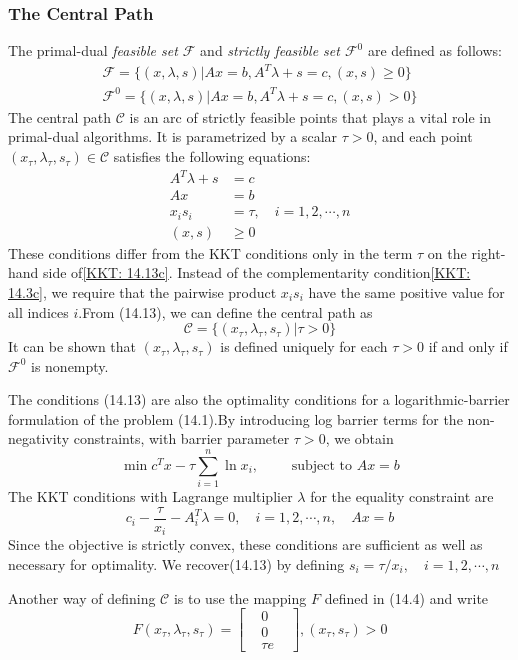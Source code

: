 \subsubsection{The Central Path}
The primal-dual \textit{feasible set $\mathcal{F} $ } and \textit{strictly feasible set $\mathcal{F}^0 $ } are defined as
follows:
\begin{align}
    \mathcal{F} = \{(x, \lambda, s)| Ax = b, A^T\lambda + s = c, (x, s) \geq 0 \}  \tag{14.12a}\label{ipm: 14.12a} \\
    \mathcal{F}^0 = \{(x, \lambda, s)| Ax = b, A^T\lambda + s = c, (x, s) > 0 \}  \tag{14.12b}\label{ipm: 14.12b}
\end{align}
The central path $\mathcal{C} $ is an arc of strictly feasible points that plays a vital role in primal-dual algorithms.
It is parametrized by a scalar $\tau > 0$, and each point $(x_\tau, \lambda_\tau, s_\tau) \in \mathcal{C}$ satisfies
the following equations:
\begin{align}
    A^T\lambda + s &= c \tag{14.13a}\label{KKT: 14.13a}\\
    Ax & = b \tag{14.13b}\label{KKT: 14.13b}\\
    x_i s_i & = \tau, \quad i = 1,2,\cdots, n \tag{14.13c} \label{KKT: 14.13c}\\
    (x, s) & \geq 0 \tag{14.13d}\label{KKT: 14.13d}
\end{align}
These conditions differ from the KKT conditions only in the term $\tau $ on the right-hand side of\eqref{KKT: 14.13c}.
Instead of the complementarity condition\eqref{KKT: 14.3c}, we require that the pairwise product $x_i s_i$ have the same
positive value for all indices $i $.From (14.13), we can define the central path as
\[
    \mathcal{C} = \{(x_\tau, \lambda_\tau, s_\tau) | \tau > 0 \}
\]
It can be shown that $(x_\tau, \lambda_\tau, s_\tau)$ is defined uniquely for each $\tau > 0$  if and only if
$\mathcal{F}^0$ is nonempty.
\par The conditions (14.13) are also the optimality conditions for a logarithmic-barrier formulation of
the problem (14.1).By introducing log barrier terms for the non-negativity constraints, with barrier parameter $\tau > 0$,
we obtain
\[
    \min c^T x - \tau \sum_{i = 1}^n \ln x_i, \qquad \text{ subject to } Ax = b \tag{14.14}\label{ipm: 14.14}
\]
The KKT conditions with Lagrange multiplier $\lambda $ for the equality constraint are
\[
    c_i - \frac{\tau}{x_i} - A_i^T \lambda = 0, \quad i = 1,2,\cdots, n, \quad Ax = b
\]
Since the objective is strictly convex, these conditions are sufficient as well as necessary for optimality.
We recover(14.13) by defining $s_i = \tau/ x_i, \quad i = 1,2,\cdots, n$
\par Another way of defining $\mathcal{C}$ is to use the mapping $F$ defined in (14.4) and write
\[
    F(x_\tau, \lambda_\tau, s_\tau) =
    \begin{bmatrix}
        & 0 & \\
        & 0 & \\
        & \tau e &
    \end{bmatrix},
    (x_\tau, s_\tau) > 0\tag{14.15}\label{ipm: 14.15}
\]

